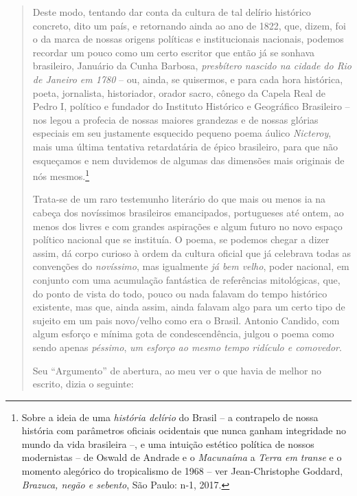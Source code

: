 \begin{quote}
Deste modo, tentando dar conta da cultura de tal delírio histórico
concreto, dito um país, e retornando ainda ao ano de 1822, que, dizem,
foi o da marca de nossas origens políticas e institucionais nacionais,
podemos recordar um pouco como um certo escritor que então já se sonhava
brasileiro, Januário da Cunha Barbosa, \emph{presbítero nascido na
cidade do Rio de Janeiro em 1780} -- ou, ainda, se quisermos, e para
cada hora histórica, poeta, jornalista, historiador, orador sacro,
cônego da Capela Real de Pedro I, político e fundador do Instituto
Histórico e Geográfico Brasileiro -- nos legou a profecia de nossas
maiores grandezas e de nossas glórias especiais em seu justamente
esquecido pequeno poema áulico \emph{Nicteroy}, mais uma última
tentativa retardatária de épico brasileiro, para que não esqueçamos e
nem duvidemos de algumas das dimensões mais originais de nós
mesmos.\footnote{Sobre a ideia de uma \emph{história delírio} do Brasil
  -- a contrapelo de nossa história com parâmetros oficiais ocidentais
  que nunca ganham integridade no mundo da vida brasileira --, e uma
  intuição estético política de nossos modernistas -- de Oswald de
  Andrade e o \emph{Macunaíma} a \emph{Terra em transe} e o momento
  alegórico do tropicalismo de 1968 -- ver Jean-Christophe Goddard,
  \emph{Brazuca, negão e sebento}, São Paulo: n-1, 2017.}

Trata-se de um raro testemunho literário do que mais ou menos ia na
cabeça dos novíssimos brasileiros emancipados, portugueses até ontem, ao
menos dos livres e com grandes aspirações e algum futuro no novo espaço
político nacional que se instituía. O poema, se podemos chegar a dizer
assim, dá corpo curioso à ordem da cultura oficial que já celebrava
todas as convenções do \emph{novíssimo}, mas igualmente \emph{já bem
velho}, poder nacional, em conjunto com uma acumulação fantástica de
referências mitológicas, que, do ponto de vista do todo, pouco ou nada
falavam do tempo histórico existente, mas que, ainda assim, ainda
falavam algo para um certo tipo de sujeito em um pais novo/velho como
era o Brasil. Antonio Candido, com algum esforço e mínima gota de
condescendência, julgou o poema como sendo apenas \emph{péssimo},
\emph{um esforço ao mesmo tempo ridículo e comovedor}.

Seu ``Argumento'' de abertura, ao meu ver o que havia de melhor no
escrito, dizia o seguinte:


\end{quote}
